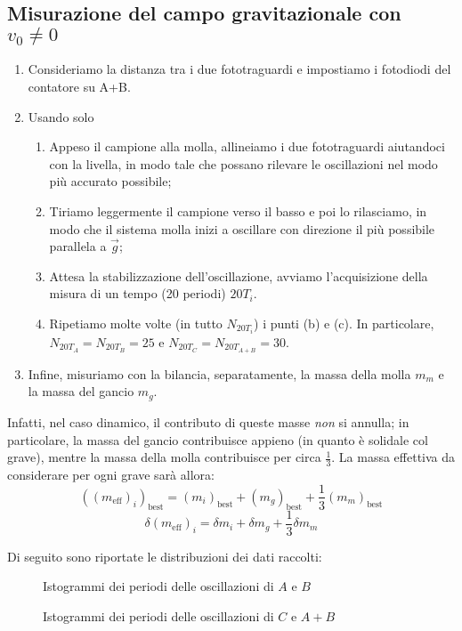 \documentclass{article}
\newcommand*{\best}[1]{{#1}_\text{best}}
\begin{document}
\subsection{Misurazione del campo gravitazionale con $v_0\ne0$}
\begin{enumerate}
    \item Consideriamo la distanza tra i due fototraguardi e impostiamo i fotodiodi
          del contatore su A+B.
    \item Usando solo
    \begin{enumerate}
        \item Appeso il campione alla molla, allineiamo i due fototraguardi
              aiutandoci con la livella, in modo tale che possano rilevare
              le oscillazioni nel modo più accurato possibile;
        \item Tiriamo leggermente il campione verso il basso e poi lo rilasciamo,
              in modo che il sistema molla inizi a oscillare con direzione
              il più possibile parallela a $\vec{g}$;
        \item Attesa la stabilizzazione dell’oscillazione, avviamo
              l'acquisizione della misura di un tempo (20 periodi)
              $20T_i$.
        \item Ripetiamo molte volte (in tutto $N_{20T_i}$) i punti
              (b) e (c). In particolare, $N_{20T_A} = N_{20T_B} = 25$
              e $N_{20T_C} = N_{20T_{A+B}} = 30$.
    \end{enumerate}
    \item Infine, misuriamo con la bilancia, separatamente,
          la massa della molla $m_m$ e la massa del gancio $m_g$.
\end{enumerate}

Infatti, nel caso dinamico, il contributo di queste masse
\emph{non} si annulla; in particolare, la massa del gancio
contribuisce appieno (in quanto è solidale col grave),
mentre la massa della molla contribuisce per circa
$\frac{1}{3}$. La massa effettiva da considerare per ogni grave
sarà allora:
\[\best{\left(\left(m_\text{eff}\right)_i\right)} = \best{\left(m_i\right)} + \best{\left(m_g\right)} + \frac{1}{3}\best{\left(m_m\right)}\]
\[\delta \left(m_\text{eff}\right)_i = \delta m_i + \delta m_g + \frac{1}{3}\delta m_m\]

Di seguito sono riportate le distribuzioni dei dati raccolti:

\begin{figure}[H]
    \caption{Istogrammi dei periodi delle oscillazioni di $A$ e $B$}
\end{figure}\begin{figure}[H]
    \caption{Istogrammi dei periodi delle oscillazioni di $C$ e $A+B$}
\end{figure}
\end{document}
